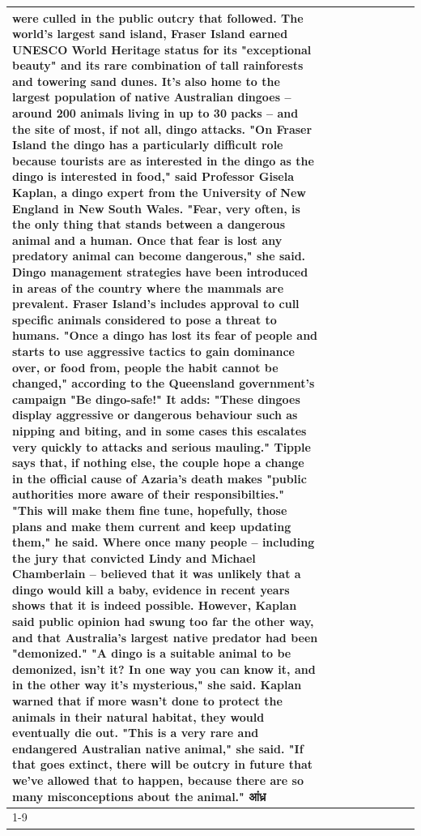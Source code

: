 \begin{table}[H]
\begin{tabular}{lllrlllll}
were culled in the public outcry that followed. The world's largest sand island, Fraser Island earned UNESCO World Heritage status for its "exceptional beauty" and its rare combination of tall rainforests and towering sand dunes. It's also home to the largest population of native Australian dingoes -- around 200 animals living in up to 30 packs -- and the site of most, if not all, dingo attacks. "On Fraser Island the dingo has a particularly difficult role because tourists are as interested in the dingo as the dingo is interested in food," said Professor Gisela Kaplan, a dingo expert from the University of New England in New South Wales. "Fear, very often, is the only thing that stands between a dangerous animal and a human. Once that fear is lost any predatory animal can become dangerous," she said. Dingo management strategies have been introduced in areas of the country where the mammals are prevalent. Fraser Island's includes approval to cull specific animals considered to pose a threat to humans. "Once a dingo has lost its fear of people and starts to use aggressive tactics to gain dominance over, or food from, people the habit cannot be changed," according to the Queensland government's campaign "Be dingo-safe!" It adds: "These dingoes display aggressive or dangerous behaviour such as nipping and biting, and in some cases this escalates very quickly to attacks and serious mauling." Tipple says that, if nothing else, the couple hope a change in the official cause of Azaria's death makes "public authorities more aware of their responsibilties." "This will make them fine tune, hopefully, those plans and make them current and keep updating them," he said. Where once many people -- including the jury that convicted Lindy and Michael Chamberlain -- believed that it was unlikely that a dingo would kill a baby, evidence in recent years shows that it is indeed possible. However, Kaplan said public opinion had swung too far the other way, and that Australia's largest native predator had been "demonized." "A dingo is a suitable animal to be demonized, isn't it? In one way you can know it, and in the other way it's mysterious," she said. Kaplan warned that if more wasn't done to protect the animals in their natural habitat, they would eventually die out. "This is a very rare and endangered Australian native animal," she said. "If that goes extinct, there will be outcry in future that we've allowed that to happen, because there are so many misconceptions about the animal." आंध्र \\
\cline{1-9}

\end{tabular}
\end{table}
